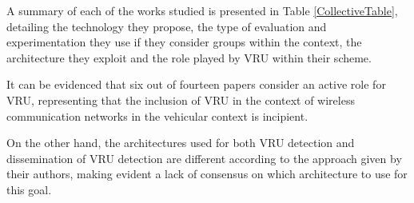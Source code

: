 A summary of each of the works studied is presented in Table \ref{CollectiveTable}, detailing the technology they propose, the type of evaluation and experimentation they use if they consider groups within the context, the architecture they exploit and the role played by VRU within their scheme. 

It can be evidenced that six out of fourteen papers consider an active role for VRU, representing that the inclusion of VRU in the context of wireless communication networks in the vehicular context is incipient. 

On the other hand, the architectures used for both VRU detection and dissemination of VRU detection are different according to the approach given by their authors, making evident a lack of consensus on which architecture to use for this goal. 


